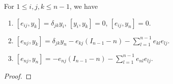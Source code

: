 \documentclass[10pt,a4paper]{amsart}
\begin{document}
\begin{lemma}\label{lemma-3.3} For $1\leq i,j, k\leq n-1$, we have
\begin{enumerate}
\item  $[e_{ij},y_k]=\delta_{jk}y_i$, $[y_i,y_k]=0$, $[e_{ij},y_n]=0$.
\item $[e_{nj},y_k]=\delta_{jk}y_n-e_{kj}(I_{n-1}-n)
-\sum_{l=1}^{n-1} e_{kl}e_{lj}$.
\item  $[e_{nj},y_n]
=-e_{nj}(I_{n-1}-n)-\sum_{l=1}^{n-1} e_{nl}e_{lj}$.
\end{enumerate}
\end{lemma}

\begin{proof}


%

\end{proof}
\end{document}
